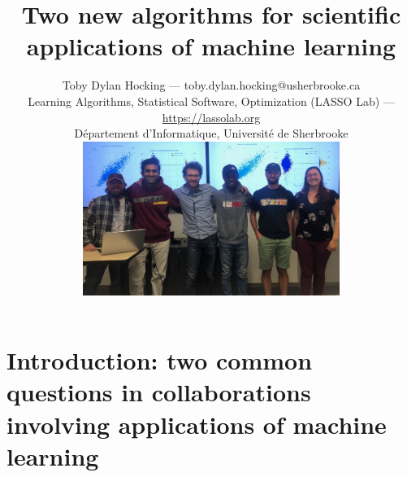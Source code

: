 \documentclass[t]{beamer}
\begin{document}
\title{Two new algorithms for scientific applications of machine learning}

\author{
  Toby Dylan Hocking --- toby.dylan.hocking@usherbrooke.ca\\ 
  Learning Algorithms, Statistical Software, Optimization (LASSO Lab) --- \url{https://lassolab.org}\\
  Département d'Informatique,  Université de Sherbrooke\\
  \includegraphics[height=5cm]{2022-10-14_ML_group_meeting.jpg} \\
}

\date{}

\maketitle

\section{Introduction: two common questions in collaborations involving applications of machine learning}
\end{document}
